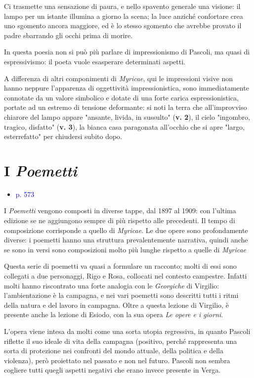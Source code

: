 \documentclass[a4paper, twoside, titlepage]{book}
\newcommand{\elenco}[1]{%
\begin{itemize}
#1
\end{itemize}}
\renewcommand{\emph}[1]{\textcolor{blue}{#1}}
\begin{document}
Ci trasmette una sensazione di paura, e nello spavento generale una visione: il lampo per un istante illumina a giorno la scena; la luce anziché confortare crea uno sgomento ancora maggiore, ed è lo stesso sgomento che avrebbe provato il padre sbarrando gli occhi prima di morire.

In questa poesia non si può più parlare di impressionismo di Pascoli, ma quasi di espressivismo: il poeta vuole esasperare determinati aspetti.

A differenza di altri componimenti di \textit{Myricae}, qui le impressioni visive non hanno neppure l'apparenza di oggettività impressionistica, sono immediatamente connotate da un valore simbolico e dotate di una forte carica espressionistica, portate ad un estremo di tensione deformante: si noti la terra che all'improvviso chiarore del lampo appare "ansante, livida, in sussulto" (\textbf{v. 2}), il cielo "ingombro, tragico, disfatto" (\textbf{v. 3}), la bianca casa paragonata all'occhio che si apre "largo, esterrefatto" per chiudersi subito dopo.


\chapter{I \textit{Poemetti}}

\elenco{\item \emph{p. 573}}

I \textit{Poemetti} vengono composti in diverse tappe, dal 1897 al 1909: con l'ultima edizione se ne aggiungono sempre di più rispetto alle precedenti.
Il tempo di composizione corrisponde a quello di \textit{Myricae}.
Le due opere sono profondamente diverse: i poemetti hanno una struttura prevalentemente narrativa, quindi anche se sono in versi sono composizioni molto più lunghe rispetto a quelle di \textit{Myricae}

Questa serie di poemetti va quasi a formulare un racconto; molti di essi sono collegati a due personaggi, Rigo e Rosa, collocati nel contesto campestre.
Infatti molti hanno riscontrato una forte analogia con le \textit{Georgiche} di Virgilio: l'ambientazione è la campagna, e nei vari poemetti sono descritti tutti i ritmi della natura e del lavoro in campagna. Oltre a questa lezione di Virgilio, è presente anche la lezione di Esiodo, con la sua opera \textit{Le opere e i giorni}.

L'opera viene intesa da molti come una sorta utopia regressiva, in quanto Pascoli riflette il suo ideale di vita della campagna (positivo, perché rappresenta una sorta di protezione nei confronti del mondo attuale, della politica e della violenza), però proiettato nel passato e non nel futuro. Pascoli non sembra cogliere tutti quegli aspetti negativi che erano invece presente in Verga.
\end{document}
